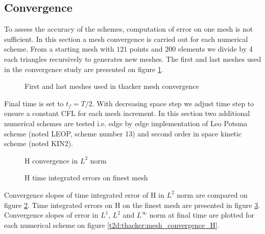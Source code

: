 \subsection{Convergence}

To assess the accuracy of the schemes, computation of error on one mesh is not sufficient.
In this section a mesh convergence is carried out for each numerical scheme. From a starting mesh
with $121$ points and $200$ elements we divide by 4 each triangles recursively to generates new meshes.
The first and last meshes used in the convergence study are presented on figure \ref{t2d:cone:meshes}. 

\begin{figure}[h!]
\begin{minipage}[t]{0.5\textwidth}
 \centering
\end{minipage}%
\begin{minipage}[t]{0.5\textwidth}
 \centering
\end{minipage}
 \caption{First and last meshes used in thacker mesh convergence}
 \label{t2d:cone:meshes}
\end{figure}

Final time is set to $t_f=T/2$.
With decreasing space step we adjust time step to ensure a constant CFL for each mesh increment.
In this section two additional numerical schemes are tested 
i.e. edge by edge implementation of Leo Potsma scheme (noted LEOP, scheme number 13)
and second order in space kinetic scheme (noted KIN2).

\begin{figure}[H]
\centering
  \caption{H convergence in $L^2$ norm}
\label{fig:thacker:ErrNumH_convergence}
\end{figure}

\begin{figure}[H]
\centering
  \caption{H time integrated errors on finest mesh}
\label{fig:thacker:ErrNumH_convergence_mesh3}
\end{figure}

Convergence slopes of time integrated error of H in $L^2$ norm are compared on figure \ref{fig:thacker:ErrNumH_convergence}.
Time integrated errors on H on the finest mesh are presented in figure \ref{fig:thacker:ErrNumH_convergence_mesh3}.
Convergence slopes of error in $L^1$, $L^2$ and $L^\infty$ norm at final time
are plotted for each numerical scheme on figure \ref{t2d:thacker:mesh_convergence_H}.

